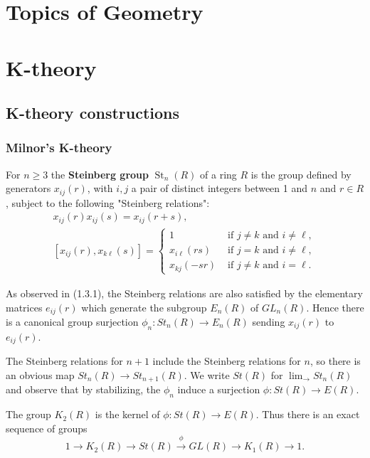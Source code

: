 \documentclass{book}
\begin{document}
\part{Topics of Geometry}




\part{K-theory}
\chapter{K-theory constructions} 

\section{Milnor's K-theory}

For $n \geq 3$ the \textbf{Steinberg group} $\operatorname{St}_n(R)$ of a ring $R$ is the group defined by generators $x_{i j}(r)$, with $i, j$ a pair of distinct integers between 1 and $n$ and $r \in R$, subject to the following "Steinberg relations":
$$
\begin{gathered}
x_{i j}(r) x_{i j}(s)=x_{i j}(r+s), \\
{\left[x_{i j}(r), x_{k \ell}(s)\right]= \begin{cases}1 & \text { if } j \neq k \text { and } i \neq \ell, \\
x_{i \ell}(r s) & \text { if } j=k \text { and } i \neq \ell, \\
x_{k j}(-s r) & \text { if } j \neq k \text { and } i=\ell .\end{cases} }
\end{gathered}
$$

As observed in (1.3.1), the Steinberg relations are also satisfied by the elementary matrices $e_{i j}(r)$ which generate the subgroup $E_n(R)$ of $G L_n(R)$. Hence there is a canonical group surjection $\phi_n: S t_n(R) \rightarrow E_n(R)$ sending $x_{i j}(r)$ to $e_{i j}(r)$.

The Steinberg relations for $n+1$ include the Steinberg relations for $n$, so there is an obvious map $S t_n(R) \rightarrow S t_{n+1}(R)$. We write $S t(R)$ for $\lim _{\longrightarrow} S t_n(R)$ and observe that by stabilizing, the $\phi_n$ induce a surjection $\phi: S t(R) \rightarrow E(R)$.


The group $K_2(R)$ is the kernel of $\phi: S t(R) \rightarrow E(R)$. Thus there is an exact sequence of groups
$$
1 \rightarrow K_2(R) \rightarrow S t(R) \xrightarrow{\phi} G L(R) \rightarrow K_1(R) \rightarrow 1 .
$$
\end{document}
